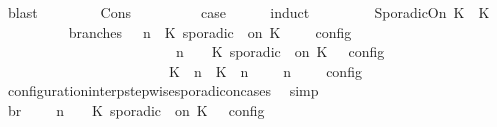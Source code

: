 \begin{isabellebody}
\ blast\isanewline
\ \ \ \ \isamarkupfalse%
\isanewline
{}\isamarkupfalse%
\isanewline
\ \ \isamarkupfalse%
\ {\isacharparenleft}Cons\ {\isasympsi}\ {\isasymPsi}{\isacharparenright}\isanewline
\ \ \ \ \isamarkupfalse%
\ \isamarkupfalse%
\ {\isacharquery}case\isanewline
\ \ \ \ \isamarkupfalse%
\ {\isacharparenleft}induct\ {\isasympsi}{\isacharparenright}\isanewline
\ \ \ \ \ \ \isamarkupfalse%
\ {\isacharparenleft}SporadicOn\ K\ {\isasymtau}\ K\isanewline
\ \ \ \ \ \ \ \ \isamarkupfalse%
\ branches{\isacharcolon}\ {\isacartoucheopen}{\isasymlbrakk}\ {\isasymGamma}{\isacharcomma}\ n\ {\isasymturnstile}\ {\isacharparenleft}{\isacharparenleft}K\ sporadic\ {\isasymtau}\ on\ K\ {\isacharhash}\ {\isasymPsi}{\isacharparenright}\ {\isasymtriangleright}\ {\isasymPhi}\ {\isasymrbrakk}\isactrlsub c\isactrlsub o\isactrlsub n\isactrlsub f\isactrlsub i\isactrlsub g\isanewline
\ \ \ \ \ \ \ \ \ \ \ \ \ \ \ \ \ \ \ \ \ \ {\isacharequal}\ {\isasymlbrakk}\ {\isasymGamma}{\isacharcomma}\ n\ {\isasymturnstile}\ {\isasymPsi}\ {\isasymtriangleright}\ {\isacharparenleft}{\isacharparenleft}K\ sporadic\ {\isasymtau}\ on\ K\ {\isacharhash}\ {\isasymPhi}{\isacharparenright}\ {\isasymrbrakk}\isactrlsub c\isactrlsub o\isactrlsub n\isactrlsub f\isactrlsub i\isactrlsub g\isanewline
\ \ \ \ \ \ \ \ \ \ \ \ \ \ \ \ \ \ \ \ \ \ {\isasymunion}\ {\isasymlbrakk}\ {\isacharparenleft}{\isacharparenleft}K\ {\isasymUp}\ n{\isacharparenright}\ {\isacharhash}\ {\isacharparenleft}K\ {\isasymDown}\ n\ {\isacharat}\ {\isasymtau}{\isacharparenright}\ {\isacharhash}\ {\isasymGamma}{\isacharparenright}{\isacharcomma}\ n\ {\isasymturnstile}\ {\isasymPsi}\ {\isasymtriangleright}\ {\isasymPhi}\ {\isasymrbrakk}\isactrlsub c\isactrlsub o\isactrlsub n\isactrlsub f\isactrlsub i\isactrlsub g{\isacartoucheclose}\isanewline
\ \ \ \ \ \ \ \ \ \ \isamarkupfalse%
\ configuration{\isacharunderscore}interp{\isacharunderscore}stepwise{\isacharunderscore}sporadicon{\isacharunderscore}cases\ \isamarkupfalse%
\ simp\isanewline
\ \ \ \ \ \ \ \ \isamarkupfalse%
\ br{}{\isacharcolon}\ {\isacartoucheopen}{\isasymrho}\ {\isasymin}\ {\isasymlbrakk}\ {\isasymGamma}{\isacharcomma}\ n\ {\isasymturnstile}\ {\isasymPsi}\ {\isasymtriangleright}\ {\isacharparenleft}{\isacharparenleft}K\ sporadic\ {\isasymtau}\ on\ K\ {\isacharhash}\ {\isasymPhi}{\isacharparenright}\ {\isasymrbrakk}\isactrlsub c\isactrlsub o\isactrlsub n\isactrlsub f\isactrlsub i\isactrlsub g\isanewline

\end{isabellebody}
